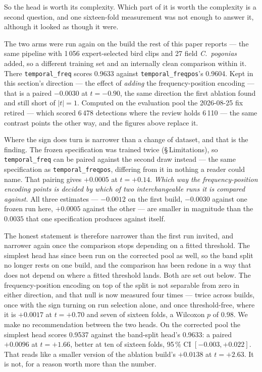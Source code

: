 \documentclass[review,3p,times]{elsarticle}
\begin{document}
So the head is worth its complexity. Which part of it is worth the complexity is
a second question, and one sixteen-fold measurement was not enough to answer it,
although it looked as though it were.

The two arms were run again on the build the rest of this paper reports --- the
same pipeline with 1\,056 expert-selected bird clips and 27 field \textit{C.\
pogonias} added, so a different training set and an internally clean comparison
within it. There \texttt{temporal\_freq} scores 0.9633 against
\texttt{temporal\_freqpos}'s 0.9604. Kept in this section's direction --- the
effect of \emph{adding} the frequency-position encoding --- that is a paired
$-0.0030$ at $t = -0.90$, the same direction the first ablation found and still
short of $|t| = 1$. Computed on the evaluation pool the 2026-08-25 fix
retired --- which scored 6\,478 detections where the review holds 6\,110 --- the
same contrast points the other way, and the figures above replace it.

Where the sign does turn is narrower than a change of dataset, and that is the
finding. The frozen specification was trained twice (\S\,Limitations), so
\texttt{temporal\_freq} can be paired against the second draw instead --- the
same specification as \texttt{temporal\_freqpos}, differing from it in nothing
a reader could name. That pairing gives $+0.0005$ at $t = +0.14$.
\emph{Which way the frequency-position encoding points is decided by which of
two interchangeable runs it is compared against.} All three estimates ---
$-0.0012$ on the first build, $-0.0030$ against one frozen run here, $+0.0005$
against the other --- are smaller in magnitude than the $0.0035$ that one
specification produces against itself.

The honest statement is therefore narrower than the first run invited, and
narrower again once the comparison stops depending on a fitted threshold. The
simplest head has since been run
on the corrected pool as well, so the band split no longer rests on one build,
and the comparison has been redone in a way that does not depend on where a
fitted threshold lands. Both are set out below. The frequency-position encoding
on top of the split is not separable from zero in either direction, and that
null is now measured four times --- twice across builds, once with the sign
turning on run selection alone, and once threshold-free, where it is
$+0.0017$ at $t = +0.70$ and seven of sixteen folds, a Wilcoxon $p$ of 0.98. We
make no recommendation between the two heads. On the corrected pool the simplest head scores 0.9537 against the band-split
head's 0.9633: a paired $+0.0096$ at $t = +1.66$, better at ten of sixteen
folds, 95\,\% CI $[-0.003, +0.022]$. That reads like a smaller version of the
ablation build's $+0.0138$ at $t = +2.63$. It is not, for a reason worth more
than the number.
\end{document}
